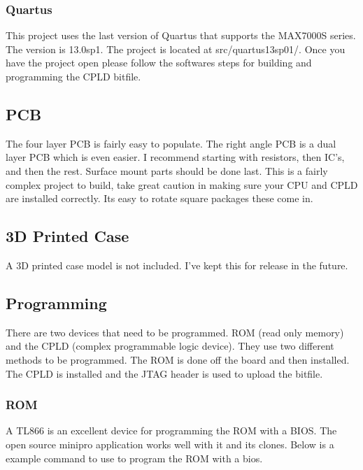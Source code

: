 \subsubsection{Quartus}
\par
This project uses the last version of Quartus that supports the MAX7000S series. The version is 13.0sp1.
The project is located at src/quartus13sp01/. Once you have the project open please follow the softwares steps
for building and programming the CPLD bitfile.

\subsection{PCB}

\par
The four layer PCB is fairly easy to populate. The right angle PCB is a dual layer PCB which is even easier.
I recommend starting with resistors, then IC's, and then the rest. Surface mount parts should be done last.
This is a fairly complex project to build, take great caution in making sure your CPU and CPLD are installed
correctly. Its easy to rotate square packages these come in.

\subsection{3D Printed Case}

\par
A 3D printed case model is not included. I've kept this for release in the future.

\subsection{Programming}

\par
There are two devices that need to be programmed. ROM (read only memory) and the CPLD (complex programmable logic device).
They use two different methods to be programmed. The ROM is done off the board and then installed. The CPLD is installed
and the JTAG header is used to upload the bitfile.

\subsubsection{ROM}

\par
A TL866 is an excellent device for programming the ROM with a BIOS. The open source minipro application works well with it and
its clones. Below is a example command to use to program the ROM with a bios.

